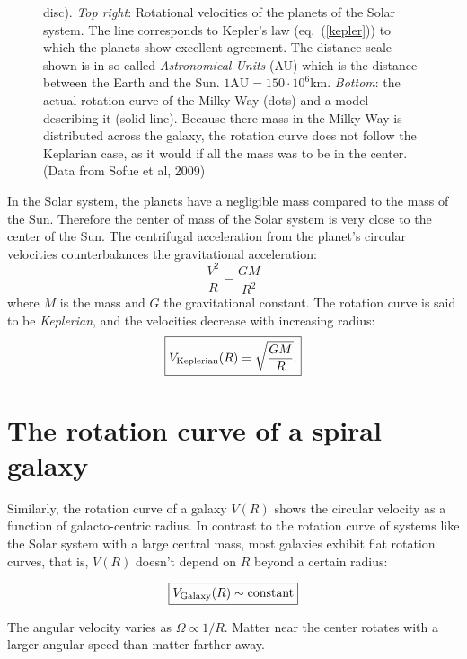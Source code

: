\begin{figure}[h]
{  disc). \emph{Top right}: Rotational velocities of the planets of the
  Solar system. The line corresponds to Kepler's law
  (eq.~(\ref{kepler})) to which the planets show excellent agreement.
  The distance scale shown is in so-called \emph{Astronomical Units}
  (AU) which is the distance between the Earth and the Sun. $1
  \text{AU}=150\cdot 10^6 \text{km}$. \emph{Bottom}: the actual
  rotation curve of the Milky Way (dots) and a model describing it
  (solid line). Because there mass in the Milky Way is distributed
  across the galaxy, the rotation curve does not follow the Keplarian
  case, as it would if all the mass was to be in the center.(Data from Sofue et al, 2009) }
\label{rotcurve}
\end{figure}  

In the Solar system, the planets have a negligible mass compared to
the mass of the Sun. Therefore the center of mass of the Solar system
is very close to the center of the Sun. The centrifugal acceleration
from the planet's circular velocities counterbalances the
gravitational acceleration:
\begin{equation}
\frac{V^2}{R}= \frac{GM}{R^2}
\end{equation}
where $M$ is the mass and $G$ the gravitational constant.  The
rotation curve is said to be {\em Keplerian}, and the velocities
decrease with increasing radius:
\begin{equation}
\boxed{V_{\rm Keplerian}(R) = \sqrt{\frac{GM}{R}}.}
\label{kepler}
\end{equation}

\section{The rotation curve of a spiral galaxy}

Similarly, the rotation curve of a galaxy $V(R)$ shows the circular
velocity as a function of galacto-centric radius.  In contrast to the
rotation curve of systems like the Solar system with a large central
mass, most galaxies exhibit flat rotation curves, that is, $V(R)$
doesn't depend on $R$ beyond a certain radius:

\begin{equation}
\boxed{V_{\rm Galaxy}(R) \sim {\rm constant}}
\end{equation}

The angular velocity varies as $\Omega \propto 1/R$. Matter near the
center rotates with a larger angular speed than matter farther away.

